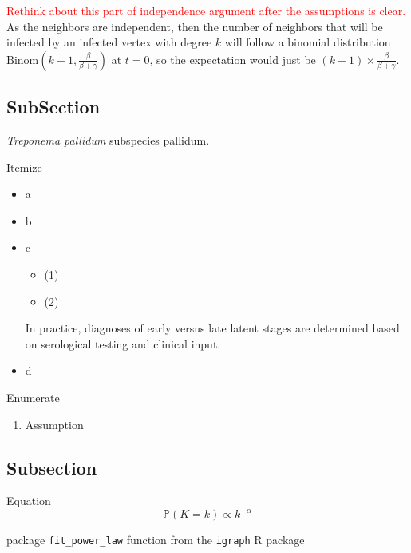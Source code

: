 \documentclass[12pt]{article}
\theoremstyle{plain}
\theoremstyle{definition}
\begin{document}
\textcolor{red}{Rethink about this part of independence argument after the assumptions is clear.}
As the neighbors are independent, then the number of neighbors that will be infected by an infected vertex with degree $k$ will follow a binomial distribution $\text{Binom}(k-1,\frac{\beta}{\beta+\gamma})$ at $t=0$, so the expectation would just be $(k-1)\times \frac{\beta}{\beta+\gamma}$.


\subsection{SubSection}
\label{sec: sub1}
\textit{Treponema pallidum} subspecies pallidum\cite{DushoffEtAl:2004,BansalMeyers:2012}.

Itemize
\begin{itemize}
	\item a
	
	\item b
	
	\item c
	\begin{itemize}
		
		\item (1)
		
		\item (2)
		
	\end{itemize} 
	
	In practice, diagnoses of early versus late latent stages are determined based on serological testing and clinical input.
	
	\item d
	
\end{itemize}

Enumerate
\begin{enumerate}
	\item [(H1)] Assumption
\end{enumerate}

\subsection{Subsection}
\label{sec: sub 2}

Equation
\begin{equation}
	\mathbb{P}(K=k) \propto k^{-\alpha}
	\label{eqn: power law}
\end{equation} 

package \verb#fit_power_law# function from the \verb#igraph# R package
\end{document}
